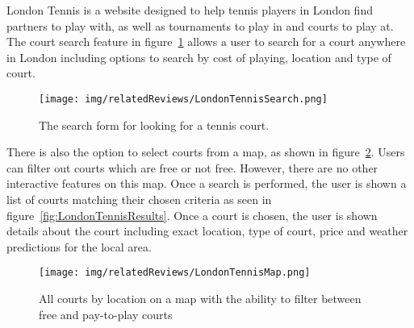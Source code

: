 London Tennis is a website designed to help tennis players in London find
partners to play with, as well as tournaments to play in and courts to play at.
The court search feature in figure~\ref{fig:LondonTennisSearch} allows a user
to search for a court anywhere in London including options to search by cost of
playing, location and type of court.
\begin{figure}[ht]
	\centering
	\texttt{[image: img/relatedReviews/LondonTennisSearch.png]}
	\caption{The search form for looking for a tennis court.}\label{fig:LondonTennisSearch}
\end{figure}


There is also the option to select courts from a map, as shown in
figure~\ref{fig:LondonTennisMap}. Users can filter out courts which are free or
not free. However, there are no other interactive features on this map. Once a
search is performed, the user is shown a list of courts matching their chosen
criteria as seen in figure~\ref{fig:LondonTennisResults}. Once a court is
chosen, the user is shown details about the court including exact location,
type of court, price and weather predictions for the local area.
\begin{figure}
	\begin{center}
		\texttt{[image: img/relatedReviews/LondonTennisMap.png]}
	\end{center}
	\caption{All courts by location on a map with the ability to filter between
	free and pay-to-play courts}\label{fig:LondonTennisMap}
\end{figure}

